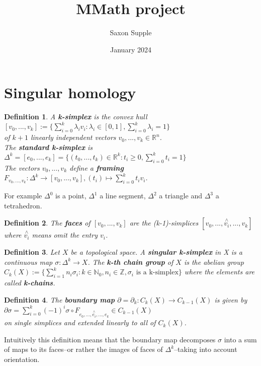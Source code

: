 \documentclass{report}
\title{MMath project}
\author{Saxon Supple }
\date{January 2024}
\newtheorem{definition}{Definition}
\begin{document}
\maketitle

\section{Singular homology}
\begin{definition}
A \textbf{k-simplex} is the convex hull\\
$[v_0,...,v_k]:=\{\sum_{i=0}^k\lambda_iv_i:\lambda_i\in [0,1],\sum_{i=0}^k\lambda_i=1\}$\\
of $k+1$ linearly independent vectors $v_0,...,v_k\in\mathbb{R}^n$.\\
The \textbf{standard k-simplex} is\\$\Delta^k=[e_0,...,e_k]=\{(t_0,...,t_k)\in\mathbb{R}^k:t_i\geq 0, \sum_{i=0}^kt_i=1\}$\\
The vectors $v_0,...,v_k$ define a \textbf{framing} $F_{v_0,...,v_k}\colon\Delta^k\rightarrow [v_0,...,v_k],(t_i)\mapsto \sum_{i=0}^kt_iv_i$.
\end{definition}


\noindent For example $\Delta^0$ is a point, $\Delta^1$ a line segment, $\Delta^2$ a triangle and $\Delta^3$ a tetrahedron.

\begin{definition}
The \textbf{faces} of $[v_0,...,v_k]$ are the (k-1)-simplices $[v_0,...,\overset{\wedge}{v_i},...,v_k]$ where $\overset{\wedge}{v_i}$ means omit the entry $v_i$.
\end{definition}

\begin{definition}
Let $X$ be a topological space. A \textbf{singular k-simplex} in X is a continuous map $\sigma\colon\Delta^k\to X$. The \textbf{k-th chain group} of $X$ is the abelian group\\
$C_k(X):=\{\sum_{i=1}^kn_i\sigma_i:k\in\mathbb{N}_0,n_i\in\mathbb{Z},\sigma_i \text{ is a k-simplex}\}$ where the elements are called \textbf{k-chains}.
\end{definition}

\begin{definition}
The \textbf{boundary map} $\partial=\partial_k\colon C_k(X)\to C_{k-1}(X)$ is given by\\
$\partial\sigma=\sum_{i=0}^k(-1)^i\sigma\circ F_{e_0,...,\overset{\wedge}{e_i},...,e_k}\in C_{k-1}(X)$\\
on single simplices and extended linearly to all of $C_k(X)$.
\end{definition}
\noindent Intuitively this definition means that the boundary map decomposes $\sigma$ into a sum of maps to its faces--or rather the images of faces of $\Delta^k$--taking into account orientation.
\end{document}
